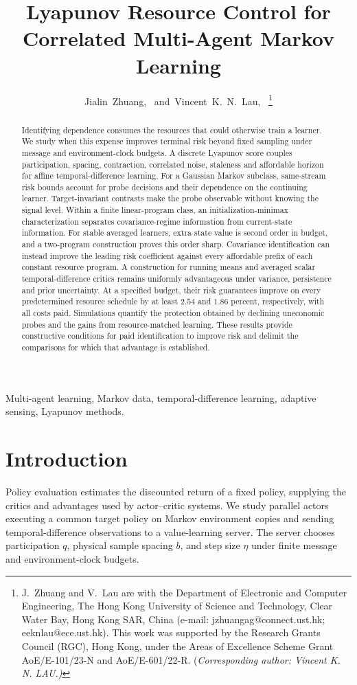 \documentclass[journal]{IEEEtran}
\title{Lyapunov Resource Control for Correlated Multi-Agent Markov Learning}
\author{Jialin~Zhuang,~\IEEEmembership{Member,~IEEE,}
and~Vincent~K.~N.~Lau,~\IEEEmembership{Fellow,~IEEE}%
\thanks{J.~Zhuang and V.~Lau are with the Department of Electronic and Computer Engineering, The Hong Kong University of Science and Technology, Clear Water Bay, Hong Kong SAR, China (e-mail: \mbox{jzhuangag@connect.ust.hk}; \mbox{eeknlau@ece.ust.hk}).
This work was supported by the Research Grants Council (RGC), Hong Kong, under the Areas of Excellence Scheme Grant AoE/E-101/23-N and AoE/E-601/22-R.
(\em{Corresponding author: Vincent K. N. LAU}.)}
}
\begin{document}
\maketitle
\begin{abstract}
Identifying dependence consumes the resources that could otherwise train a learner.
We study when this expense improves terminal risk beyond fixed sampling under message and environment-clock budgets.
A discrete Lyapunov score couples participation, spacing, contraction, correlated noise, staleness and affordable horizon for affine temporal-difference learning.
For a Gaussian Markov subclass, same-stream risk bounds account for probe decisions and their dependence on the continuing learner.
Target-invariant contrasts make the probe observable without knowing the signal level.
Within a finite linear-program class, an initialization-minimax characterization separates covariance-regime information from current-state information.
For stable averaged learners, extra state value is second order in budget, and a two-program construction proves this order sharp.
Covariance identification can instead improve the leading risk coefficient against every affordable prefix of each constant resource program.
A construction for running means and averaged scalar temporal-difference critics remains uniformly advantageous under variance, persistence and prior uncertainty.
At a specified budget, their risk guarantees improve on every predetermined resource schedule by at least $2.54$ and $1.86$ percent, respectively, with all costs paid.
Simulations quantify the protection obtained by declining uneconomic probes and the gains from resource-matched learning.
These results provide constructive conditions for paid identification to improve risk and delimit the comparisons for which that advantage is established.
\end{abstract}
\begin{IEEEkeywords}
Multi-agent learning, Markov data, temporal-difference learning, adaptive sensing, Lyapunov methods.
\end{IEEEkeywords}

\section{Introduction}
Policy evaluation estimates the discounted return of a fixed policy, supplying the critics and advantages used by actor--critic systems.
We study parallel actors executing a common target policy on Markov environment copies and sending temporal-difference observations to a value-learning server.
The server chooses participation $q$, physical sample spacing $b$, and step size $\eta$ under finite message and environment-clock budgets.
\end{document}
